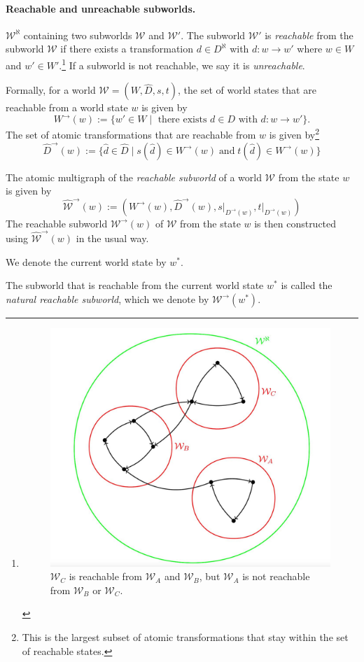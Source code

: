 \paragraph{Reachable and unreachable subworlds.}
 $\mathscr{W}^{\aleph}$ containing two subworlds $\mathscr{W}$ and $\mathscr{W}'$.
The subworld $\mathscr{W}'$ is \emph{reachable} from the subworld $\mathscr{W}$ if there exists a transformation $d \in D^{\aleph}$ with $d: w \to w'$ where $w \in W$ and $w' \in W'$.\footnote{
\begin{figure}[H]
	\includegraphics[width=0.5\linewidth]{2MathematicalFramework/Images/reachable_worlds.jpeg}
	\caption{
		$\mathscr{W}_{C}$ is reachable from $\mathscr{W}_{A}$ and $\mathscr{W}_{B}$, but $\mathscr{W}_{A}$ is not reachable from $\mathscr{W}_{B}$ or $\mathscr{W}_{C}$.
	}
	\label{fig:reachable_worlds}
\end{figure}
}
If a subworld is not reachable, we say it is \emph{unreachable}.

Formally, for a world $\mathscr{W} = (W, \hat{D}, s, t)$, the set of world states that are reachable from a world state $w$ is given by
\begin{equation}
	W^{\to}(w) := \{ w' \in W \mid \text{ there exists } d \in D \text{ with } d: w \to w' \}.
\end{equation}
The set of atomic transformations that are reachable from $w$ is given by\footnote{
	This is the largest subset of atomic transformations that stay within the set of reachable states.
}
\begin{equation}
	\hat{D}^{\to}(w) := \{ \hat{d} \in \hat{D} \mid s(\hat{d}) \in W^{\to}(w) \; \text{and} \; t(\hat{d}) \in W^{\to}(w) \}
\end{equation}

The atomic multigraph of the \emph{reachable subworld} of a world $\mathscr{W}$ from the state $w$ is given by
\begin{equation}
	\hat{\mathscr{W}}^{\to}(w) := (W^{\to}(w), \hat{D}^{\to}(w), s \big|_{D^{\to}(w)}, t \big|_{D^{\to}(w)})
\end{equation}
The reachable subworld $\mathscr{W}^{\to}(w)$ of $\mathscr{W}$ from the state $w$ is then constructed using $\hat{\mathscr{W}}^{\to}(w)$ in the usual way.

\begin{notation}
	We denote the current world state by $w^{*}$.
\end{notation}

The subworld that is reachable from the current world state $w^{*}$ is called the \emph{natural reachable subworld}, which we denote by $\mathscr{W}^{\to}(w^{*})$.

